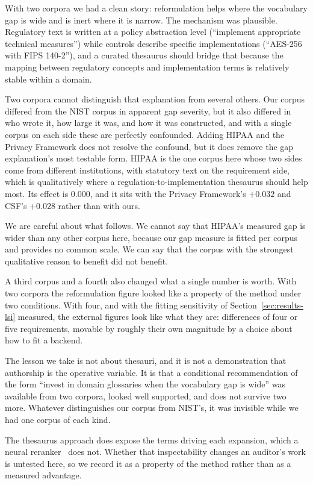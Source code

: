 \documentclass[a4paper,fleqn]{cas-sc}
\begin{document}
With two corpora we had a clean story: reformulation helps where the vocabulary gap is wide and is inert where it is narrow. The mechanism was plausible. Regulatory text is written at a policy abstraction level (``implement appropriate technical measures'') while controls describe specific implementations (``AES-256 with FIPS 140-2''), and a curated thesaurus should bridge that because the mapping between regulatory concepts and implementation terms is relatively stable within a domain.

Two corpora cannot distinguish that explanation from several others. Our corpus differed from the NIST corpus in apparent gap severity, but it also differed in who wrote it, how large it was, and how it was constructed, and with a single corpus on each side these are perfectly confounded. Adding HIPAA and the Privacy Framework does not resolve the confound, but it does remove the gap explanation's most testable form. HIPAA is the one corpus here whose two sides come from different institutions, with statutory text on the requirement side, which is qualitatively where a regulation-to-implementation thesaurus should help most. Its effect is $0.000$, and it sits with the Privacy Framework's $+0.032$ and CSF's $+0.028$ rather than with ours.

We are careful about what follows. We cannot say that HIPAA's measured gap is wider than any other corpus here, because our gap measure is fitted per corpus and provides no common scale. We can say that the corpus with the strongest qualitative reason to benefit did not benefit.

A third corpus and a fourth also changed what a single number is worth. With two corpora the reformulation figure looked like a property of the method under two conditions. With four, and with the fitting sensitivity of Section~\ref{sec:results-lsi} measured, the external figures look like what they are: differences of four or five requirements, movable by roughly their own magnitude by a choice about how to fit a backend.

The lesson we take is not about thesauri, and it is not a demonstration that authorship is the operative variable. It is that a conditional recommendation of the form ``invest in domain glossaries when the vocabulary gap is wide'' was available from two corpora, looked well supported, and does not survive two more. Whatever distinguishes our corpus from NIST's, it was invisible while we had one corpus of each kind.

The thesaurus approach does expose the terms driving each expansion, which a neural reranker~\citep{Nogueira2019} does not.
Whether that inspectability changes an auditor's work is untested here, so we record it as a property of the method rather than as a measured advantage.
\end{document}
